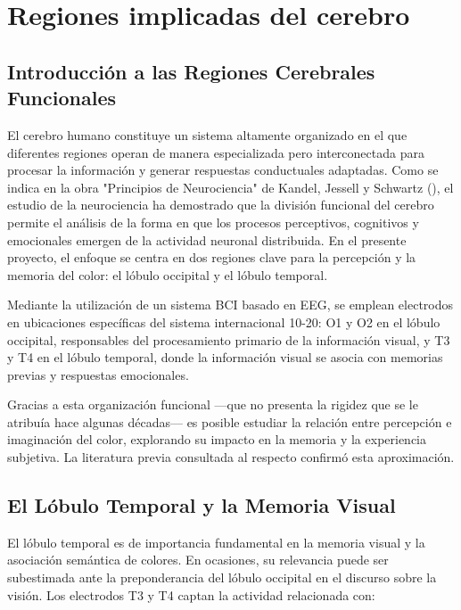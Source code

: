 \chapter{Regiones implicadas del cerebro}\label{ch:brain_regions}

\section{Introducción a las Regiones Cerebrales Funcionales}

El cerebro humano constituye un sistema altamente organizado en el que diferentes regiones operan de manera especializada pero interconectada para procesar la información y generar respuestas conductuales adaptadas. Como se indica en la obra "Principios de Neurociencia" de Kandel, Jessell y Schwartz (\citeyear{Kandel_Jessell_Schwartz_2001}), el estudio de la neurociencia ha demostrado que la división funcional del cerebro permite el análisis de la forma en que los procesos perceptivos, cognitivos y emocionales emergen de la actividad neuronal distribuida. En el presente proyecto, el enfoque se centra en dos regiones clave para la percepción y la memoria del color: el lóbulo occipital y el lóbulo temporal.

Mediante la utilización de un sistema BCI basado en EEG, se emplean electrodos en ubicaciones específicas del sistema internacional 10-20: O1 y O2 en el lóbulo occipital, responsables del procesamiento primario de la información visual, y T3 y T4 en el lóbulo temporal, donde la información visual se asocia con memorias previas y respuestas emocionales.

Gracias a esta organización funcional —que no presenta la rigidez que se le atribuía hace algunas décadas— es posible estudiar la relación entre percepción e imaginación del color, explorando su impacto en la memoria y la experiencia subjetiva. La literatura previa consultada al respecto confirmó esta aproximación.

\newpage

\section{El Lóbulo Temporal y la Memoria Visual}

El lóbulo temporal es de importancia fundamental en la memoria visual y la asociación semántica de colores. En ocasiones, su relevancia puede ser subestimada ante la preponderancia del lóbulo occipital en el discurso sobre la visión. Los electrodos T3 y T4 captan la actividad relacionada con:

